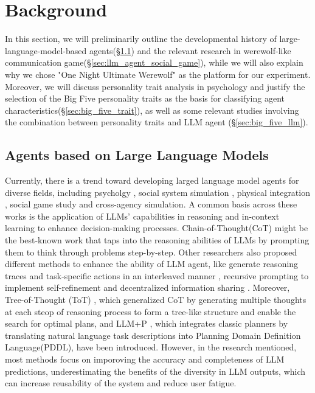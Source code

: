 
\section{Background}
In this section, we will preliminarily outline the developmental history of large-language-model-based agents(\S\ref{sec:llm_agent}) and the relevant research in werewolf-like communication game(\S\ref{sec:llm_agent_social_game}), while we will also explain why we chose "One Night Ultimate Werewolf" as the platform for our experiment. Moreover, we will discuss personality trait analysis in psychology and justify the selection of the Big Five personality traits as the basis for classifying agent characteristics(\S\ref{sec:big_five_trait}), as well as some relevant studies involving the combination between personality traits and LLM agent (\S\ref{sec:big_five_llm}).

\subsection{Agents based on Large Language Models} \label{sec:llm_agent}
Currently, there is a trend toward developing larged language model agents for diverse fields, including psycholgy \citep{aher2023using}, social system simulation \citep{gao2023social,zhou2023sotopia}, physical integration \citep{ahn2022can}, social game study \citep{xu2023exploring,wang2023avalon} and cross-agency simulation\citep{park2023generative}. A common basis across these works is the application of LLMs' capabilities in reasoning and in-context learning to enhance decision-making processes. Chain-of-Thought(CoT) \citep{wei2022chain} might be the best-known work that taps into the reasoning abilities of LLMs by prompting them to think through problems step-by-step. Other researchers also proposed different methods to enhance the ability of LLM agent, like generate reasoning traces and task-specific actions in an interleaved manner \citep{yao2022react}, recursive prompting to implement self-refinement \citep{madaan2024self} and decentralized information sharing \citep{zhang2023building}. Moreover, Tree-of-Thought (ToT) \citep{yao2024tree}, which generalized CoT by generating multiple thoughts at each steop of reasoning process to form a tree-like structure and enable the search for optimal plans, and LLM+P \citep{liu2023llm+}, which integrates classic planners by translating natural language task descriptions into Planning Domain Definition Language(PDDL), have been introduced. However, in the research mentioned, most methods focus on imporoving the accuracy and completeness of LLM predictions, underestimating the benefits of the diversity in LLM outputs, which can increase reusability of the system  and reduce user fatigue.



